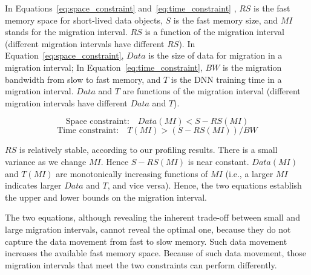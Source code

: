 In Equations~\ref{eq:space_constraint} and~\ref{eq:time_constraint} , $RS$ is the fast memory space for short-lived data objects, $S$ is the fast memory size, and $MI$ stands for the migration interval. $RS$ is a function of the migration interval (different migration intervals have different $RS$). In Equation~\ref{eq:space_constraint}, $Data$ is the size of data for migration in a migration interval; In Equation~\ref{eq:time_constraint}, $BW$ is the migration bandwidth from slow to fast memory, and $T$ is the DNN training time in a migration interval. $Data$ and $T$ are functions
of the migration interval (different migration intervals have different $Data$ and $T$).  

\vspace{-10pt}
\begin{equation}
\label{eq:space_constraint}
   \text{Space constraint:} \quad Data(MI) < S - RS(MI)  
\end{equation}
\vspace{-10pt}
\begin{equation}
\label{eq:time_constraint}
   \text{Time constraint:} \quad T(MI) > (S - RS(MI))/BW 
\end{equation}

$RS$ is relatively stable, according to our profiling results. There is a small variance as we change $MI$. Hence $S - RS(MI)$ is near constant. $Data(MI)$ and $T(MI)$ are monotonically increasing functions of $MI$ (i.e., a larger $MI$ indicates larger $Data$ and $T$, and vice versa). Hence, the two equations establish the upper and lower bounds on the migration interval. 

The two equations, although revealing the inherent trade-off between small and large migration intervals, cannot reveal the optimal one, because they do not capture the data movement from fast to slow memory. Such data movement increases the available fast memory space. Because of such data movement, those migration intervals that meet the two constraints can perform differently. 

